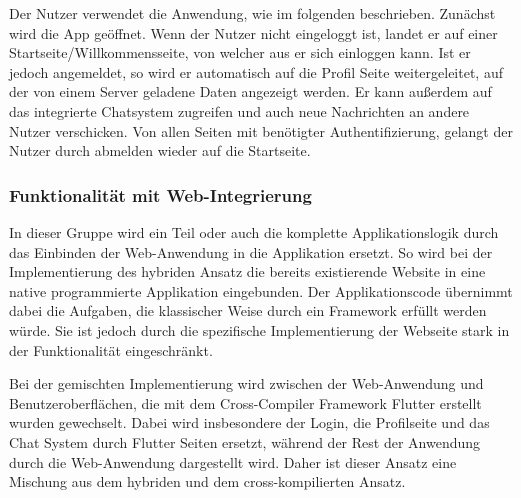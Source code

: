 Der Nutzer verwendet die Anwendung, wie im folgenden beschrieben. Zunächst wird die App geöffnet. Wenn der Nutzer nicht eingeloggt ist, landet er auf einer Startseite/Willkommensseite, von welcher aus er sich einloggen kann. Ist er jedoch angemeldet, so wird er automatisch auf die Profil Seite weitergeleitet, auf der von einem Server geladene Daten angezeigt werden. Er kann außerdem auf das integrierte Chatsystem zugreifen und auch neue Nachrichten an andere Nutzer verschicken. Von allen Seiten mit benötigter Authentifizierung, gelangt der Nutzer durch abmelden wieder auf die Startseite.

\subsubsection{Funktionalität mit Web-Integrierung}
In dieser Gruppe wird ein Teil oder auch die komplette Applikationslogik durch das Einbinden der Web-Anwendung in die Applikation ersetzt. So wird bei der Implementierung des hybriden Ansatz die bereits existierende Website in eine native programmierte Applikation eingebunden. Der Applikationscode übernimmt dabei die Aufgaben, die klassischer Weise durch ein Framework erfüllt werden würde. Sie ist jedoch durch die spezifische Implementierung der Webseite stark in der Funktionalität eingeschränkt.

Bei der gemischten   Implementierung wird zwischen der Web-Anwendung und Benutzeroberflächen, die mit dem Cross-Compiler Framework Flutter erstellt wurden gewechselt. Dabei wird insbesondere der Login, die Profilseite und das Chat System durch Flutter Seiten ersetzt, während der Rest der Anwendung durch die Web-Anwendung dargestellt wird. Daher ist dieser Ansatz eine Mischung aus dem hybriden und dem cross-kompilierten Ansatz.


